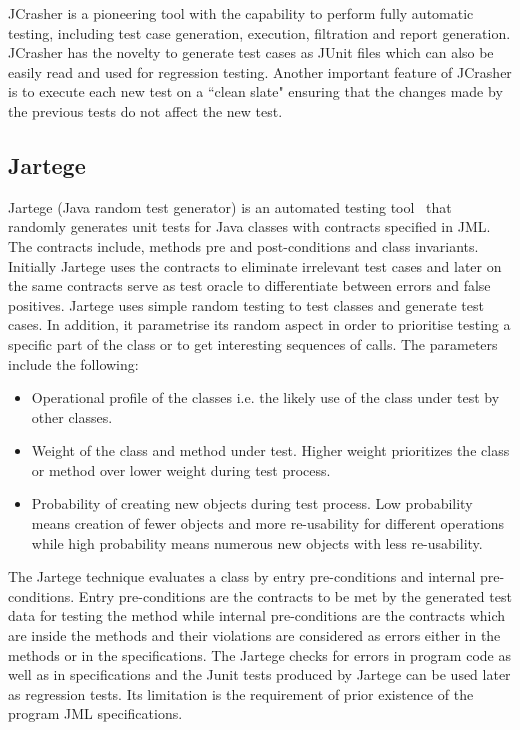 JCrasher is a pioneering tool with the capability to perform fully automatic testing, including test case generation, execution, filtration and report generation. JCrasher has the novelty to generate test cases as JUnit files which can also be easily read and used for regression testing. Another important feature of JCrasher is to execute each new test on a ``clean slate" ensuring that the changes made by the previous tests do not affect the new test.  



\subsection{Jartege} \label{jartege_2}
Jartege (Java random test generator) is an automated testing tool~\cite{oriat2005jartege} that randomly generates unit tests for Java classes with contracts specified in JML. The contracts include, methods pre and post-conditions and class invariants. Initially Jartege uses the contracts to eliminate irrelevant test cases and later on the same contracts serve as test oracle to differentiate between errors and false positives. Jartege uses simple random testing to test classes and generate test cases. In addition, it parametrise its random aspect in order to prioritise testing a specific part of the class or to get interesting sequences of calls. The parameters include the following: 

\begin{itemize}
\item Operational profile of the classes i.e. the likely use of the class under test by other classes.  
\item Weight of the class and method under test. Higher weight prioritizes the class or method over lower weight during test process. 
\item Probability of creating new objects during test process. Low probability means creation of fewer objects and more re-usability for different operations while high probability means numerous new objects with less re-usability.
\end{itemize}

The Jartege technique evaluates a class by entry pre-conditions and internal pre-conditions. Entry pre-conditions are the contracts to be met by the generated test data for testing the method while internal pre-conditions are the contracts which are inside the methods and their violations are considered as errors either in the methods or in the specifications. The Jartege checks for errors in program code as well as in specifications and the Junit tests produced by Jartege can be used later as regression tests. Its limitation is the requirement of prior existence of the program JML specifications.

